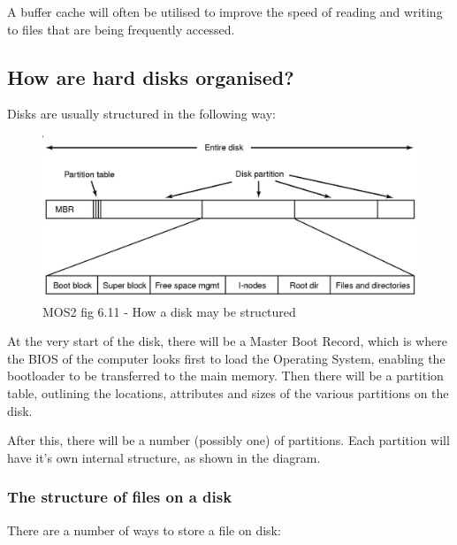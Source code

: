 A buffer cache will often be utilised to improve the speed of reading and
writing to files that are being frequently accessed.

\subsection{How are hard disks organised?}

Disks are usually structured in the following way:

\begin{figure}[ht!]
  \centering
  \includegraphics[width=\textwidth]{images/disk-structure}
  \caption{MOS2 fig 6.11 - How a disk may be structured}
  \label{disk-structure}
\end{figure}

At the very start of the disk, there will be a Master Boot Record, which is
where the BIOS of the computer looks first to load the Operating System,
enabling the bootloader to be transferred to the main memory. Then there will be
a partition table, outlining the locations, attributes and sizes of the various
partitions on the disk.

After this, there will be a number (possibly one) of partitions. Each partition
will have it's own internal structure, as shown in the diagram.

\subsubsection{The structure of files on a disk}
\label{files-on-disk}
There are a number of ways to store a file on disk:

